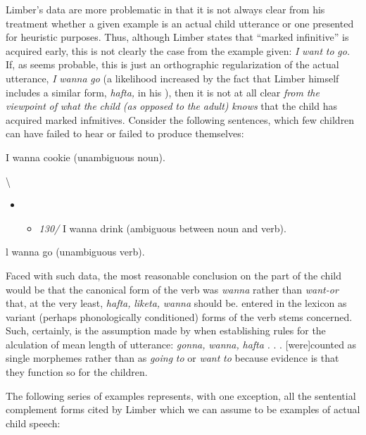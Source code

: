 Limber's data are more problematic in that it is not always clear from his treatment whether a given example is an actual child utterance or one presented for heuristic purposes. Thus, although Limber states that ``marked infinitive'' is acquired early, this is not clearly the case from the example given: \textit{I} \textit{want} \textit{to} \textit{go.} If, as seems probable, this is just an orthographic regularization of the actual utterance, \textit{I} \textit{wanna} \textit{go} (a likelihood increased by the fact that Limber himself includes a similar form, \textit{h}\textit{a}\textit{fta,} in his ), then it is not at all clear \textit{from} \textit{the} \textit{viewpoint} \textit{of} \textit{what} \textit{the} \textit{child }\textit{(as} \textit{opposed} \textit{to} \textit{the} \textit{adult)} \textit{knows} that the child has acquired marked infmitives. Consider the following sentences, which few children can have failed to hear or failed to produce themselves:

\ea\label{ex:29}
 I wanna cookie (unambiguous noun).
\glt
\z

{\textbackslash}


\begin{itemize}
\item \begin{itemize}
\item \textit{130/} I wanna drink (ambiguous between noun and verb).
\end{itemize}
\end{itemize}

\ea\label{ex:31}
 l wanna go (unambiguous verb).
\glt
\z

Faced with such data, the most reasonable conclusion on the part of the child would be that the canonical form of the verb was \textit{wanna} rather than \textit{want-or} that, at the very least, \textit{hafta,} \textit{liketa,} \textit{wanna} should be. entered in the lexicon as variant (perhaps phonologically condi\-tioned) forms of the verb stems concerned. Such, certainly, is the assumption made by \citet[54]{Brown1973} when establishing rules for the alculation of mean length of utterance: \textit{{\textquotedbl}gonna,} \textit{wanna,} \textit{hafta} \textit{.} . . [were]counted as single morphemes rather than as \textit{going} \textit{to} or \textit{want} \textit{to} because evidence is that they function so for the children.{\textquotedbl}

The following series of examples represents, with one exception, all the sentential complement forms cited by Limber which we can assume to be examples of actual child speech:

